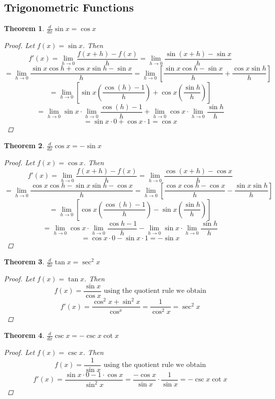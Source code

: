 \documentclass[10pt]{report}
\newtheorem{thm3}{Theorem}[subsection]
\begin{document}
\subsection{Trigonometric Functions}
\begin{thm3}
$\frac{d}{dx}\sin x=\cos x$
\begin{proof}
Let $f(x)=\sin x$. Then
$$f'(x)=\lim_{h\to 0}\frac{f(x+h)-f(x)}{h}=\lim_{h\to 0}\frac{\sin{(x+h)}-\sin{x}}{h}$$
$$=\lim_{h\to 0}\frac{\sin{x}\cos{h}+\cos{x}\sin{h} -\sin{x}}{h}=\lim_{h\to 0}\left[\frac{\sin{x}\cos{h}-\sin{x}}{h} + \frac{\cos{x}\sin{h}}{h}\right]$$
$$=\lim_{h\to 0}\left[\sin{x}\left(\frac{\cos{(h)}-1}{h}\right)+ \cos{x}\left(\frac{\sin{h}}{h}\right)\right]$$
$$=\lim_{h\to 0}\sin{x}\cdot \lim_{h\to 0}\frac{\cos{(h)}-1}{h}+ \lim_{h\to 0}\cos{x}\cdot\lim_{h\to 0}\frac{\sin{h}}{h}$$
$$=\sin{x}\cdot 0 + \cos{x}\cdot 1 =\cos{x}$$
\end{proof}
\end{thm3}
\begin{thm3}
$\frac{d}{dx}\cos x=-\sin x$
\begin{proof}
Let $f(x)=\cos{x}$. Then
$$f'(x)=\lim_{h\to 0}\frac{f(x+h)-f(x)}{h}=\lim_{h\to 0}\frac{\cos{(x+h)}-\cos{x}}{h}$$
$$=\lim_{h\to 0}\frac{\cos{x}\cos{h}-\sin{x}\sin{h} -\cos{x}}{h}=\lim_{h\to 0}\left[\frac{\cos{x}\cos{h}-\cos{x}}{h} - \frac{\sin{x}\sin{h}}{h}\right]$$
$$=\lim_{h\to 0}\left[\cos{x}\left(\frac{\cos{(h)}-1}{h}\right)- \sin{x}\left(\frac{\sin{h}}{h}\right)\right]$$
$$=\lim_{h\to 0}\cos{x}\cdot \lim_{h\to 0}\frac{\cos{h}-1}{h} - \lim_{h\to 0}\sin{x}\cdot\lim_{h\to 0}\frac{\sin{h}}{h}$$
$$=\cos{x}\cdot 0 - \sin{x}\cdot 1 =-\sin{x}$$
\end{proof}
\end{thm3}
\begin{thm3}
$\frac{d}{dx}\tan x=\sec^2x$
\begin{proof}
Let $f(x)=\tan{x}$. Then 
$$f(x)=\frac{\sin{x}}{\cos{x}} \text{ using the quotient rule we obtain}$$
$$f'(x)=\frac{\cos^2x+\sin^2x}{\cos^x}=\frac{1}{\cos^2x} =\sec^2x$$
\end{proof}
\end{thm3}
\begin{thm3}
$\frac{d}{dx}\csc x=-\csc x\cot x$
\begin{proof}
Let $f(x)=\csc{x}$. Then
$$f(x)=\frac{1}{\sin{x}}\text{ using the quotient rule we obtain}$$
$$f'(x)=\frac{\sin{x}\cdot 0 - 1\cdot \cos{x}}{\sin^2x}=\frac{-\cos{x}}{\sin{x}}\cdot\frac{1}{\sin{x}}=-\csc{x}\cot{x}$$
\end{proof}
\end{thm3}
\end{document}
